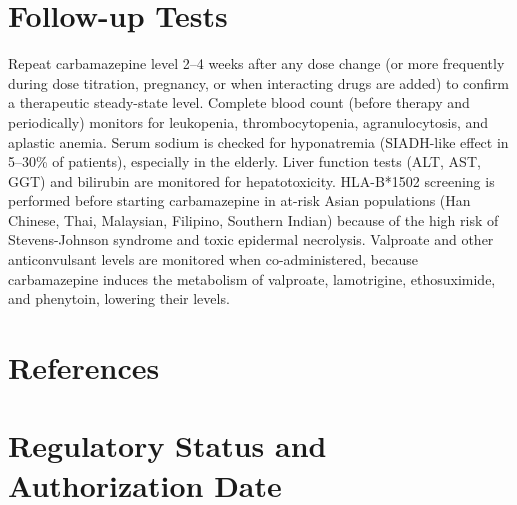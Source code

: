 \section*{Follow-up Tests}
Repeat carbamazepine level 2--4 weeks after any dose change (or more frequently during dose titration, pregnancy, or when interacting drugs are added) to confirm a therapeutic steady-state level. Complete blood count (before therapy and periodically) monitors for leukopenia, thrombocytopenia, agranulocytosis, and aplastic anemia. Serum sodium is checked for hyponatremia (SIADH-like effect in 5--30\% of patients), especially in the elderly. Liver function tests (ALT, AST, GGT) and bilirubin are monitored for hepatotoxicity. HLA-B*1502 screening is performed before starting carbamazepine in at-risk Asian populations (Han Chinese, Thai, Malaysian, Filipino, Southern Indian) because of the high risk of Stevens-Johnson syndrome and toxic epidermal necrolysis. Valproate and other anticonvulsant levels are monitored when co-administered, because carbamazepine induces the metabolism of valproate, lamotrigine, ethosuximide, and phenytoin, lowering their levels.

\section*{References}



\clearpage
\section*{Regulatory Status and Authorization Date}

\clearpage
